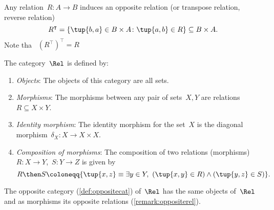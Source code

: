 

\begin{remark}
\label{remark:oppositerel}
Any relation~$R\colon A\to B$ induces an opposite relation (or transpose relation, reverse relation) \begin{equation}
    R^\intercal =\{\tup{b,a}\in B\times A\colon \tup{a,b}\in R\} \subseteq B\times A.
\end{equation}
Note tha~ $\left( R^\intercal\right)^\intercal = R$
\end{remark}

\begin{definition}
    The category~$\Rel$ is defined by:
    \begin{enumerate}
    \item \emph{Objects}: The objects of this category are all sets.
    \item \emph{Morphisms}: The morphisms between any pair of sets~$X, Y$
    are relations~$R\subseteq X\times Y$.
    \item \emph{Identity morphism}: The identity morphism for the set~$X$
    is the diagonal morphism~$\delta_X \colon X\to X\times X$.
    \item \emph{Composition of morphisms}: The composition of two relations (morphisms)~$R \colon X\to Y$,~$S\colon Y\to Z$ is given by
    \begin{equation}
    R \then S \coloneqq \{\tup{x,z} \equiv  \exists y \in Y, \ \left(\tup{x,y} \in R\right) \wedge \left(\tup{y,z} \in S\right)\}.
    \end{equation}
    \end{enumerate}
\end{definition}
\begin{remark}
The opposite category (\cref{def:oppositecat}) of~$\Rel$ has the same objects of~$\Rel$ and as morphisms its opposite relations (\cref{remark:oppositerel}).
\end{remark}

